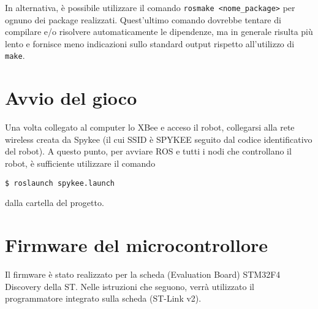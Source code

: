 \begin{nota}
In alternativa, è possibile utilizzare il comando \verb|rosmake <nome_package>| per ognuno dei package realizzati. Quest'ultimo comando dovrebbe tentare di compilare e/o risolvere automaticamente le dipendenze, ma in generale risulta più lento e fornisce meno indicazioni sullo standard output rispetto all'utilizzo di \verb|make|.
\end{nota}

\section{Avvio del gioco} Una volta collegato al computer lo XBee e acceso il robot, collegarsi alla rete wireless creata da Spykee (il cui SSID è SPYKEE seguito dal codice identificativo del robot). A questo punto, per avviare ROS e tutti i nodi che controllano il robot, è sufficiente utilizzare il comando
\begin{verbatim}
$ roslaunch spykee.launch
\end{verbatim}
dalla cartella del progetto.

\section{Firmware del microcontrollore}

Il firmware è stato realizzato per la scheda (Evaluation Board) STM32F4 Discovery della ST. Nelle istruzioni che seguono, verrà utilizzato il programmatore integrato sulla scheda (ST-Link v2).

